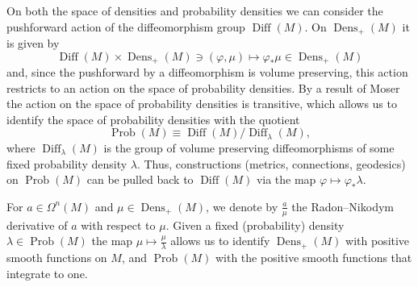 \documentclass[11pt,reqno]{amsart}
\theoremstyle{definition}
\newcommand{\dx}{\lambda}
\newcommand{\Prob}{\operatorname{Prob}(M)}
\newcommand{\Dens}{\operatorname{Dens}_+(M)}
\newcommand{\Diff}{\operatorname{Diff}(M)}
\newcommand{\SDiff}{\operatorname{Diff}_{\dx}(M)}
\begin{document}
On both the space of  densities and probability densities
we can consider the pushforward action of the diffeomorphism group $\Diff$.  On $\Dens$ it is given by
\begin{equation}\label{eq:pushforward}
\Diff\times \Dens\ni (\varphi,\mu)\mapsto \varphi_*\mu \in \Dens
\end{equation}
and, since the pushforward by a diffeomorphism is volume preserving, this action restricts to an action on the space of probability densities. 
By a result of Moser~\cite{moser1965volume} the action on the space of probability densities is transitive, which allows us to identify the space of probability densities with the quotient
\begin{equation*}
\Prob\equiv \Diff/\SDiff, 
\end{equation*}
where $\SDiff$ is the group of volume preserving diffeomorphisms of some fixed probability density $\dx$. 
Thus, constructions (metrics, connections, geodesics) on $\Prob$ can be pulled back to $\Diff$ via the map $\varphi\mapsto \varphi_*\dx$.

For $a\in \Omega^n(M)$ and $\mu\in \Dens$, we denote by $\frac{a}{\mu}$ the Radon--Nikodym derivative of $a$ with respect to $\mu$. Given a fixed (probability) density $\lambda\in \Prob$ the map $\mu \mapsto \frac{\mu}{\dx}$ allows us to identify $\Dens$ with positive smooth functions on $M$, and $\Prob$ with the positive smooth functions that integrate to one.
\end{document}
